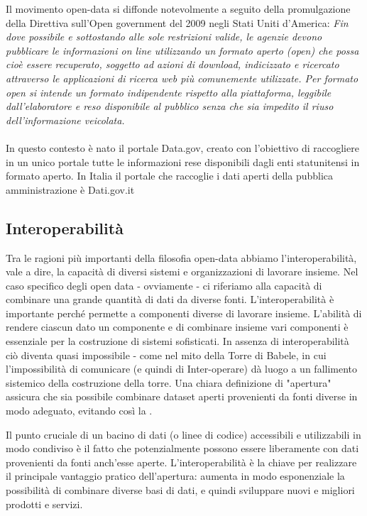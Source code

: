 \documentclass{article}
\theoremstyle{plain}
\theoremstyle{definition}
\begin{document}
Il movimento open-data si diffonde notevolmente a seguito della promulgazione della Direttiva sull'Open government del 2009 negli Stati Uniti d'America:
\textit{Fin dove possibile e sottostando alle sole restrizioni valide, le agenzie devono pubblicare le informazioni on line utilizzando un formato aperto (open) che possa cioè essere recuperato, soggetto ad azioni di download, indicizzato e ricercato attraverso le applicazioni di ricerca web più comunemente utilizzate. Per formato open si intende un formato indipendente rispetto alla piattaforma, leggibile dall'elaboratore e reso disponibile al pubblico senza che sia impedito il riuso dell'informazione veicolata.}
\\
\\
In questo contesto è nato il portale Data.gov, creato con l'obiettivo di raccogliere in un unico portale tutte le informazioni rese disponibili dagli enti statunitensi in formato aperto. In Italia il portale che raccoglie i dati aperti della pubblica amministrazione è Dati.gov.it
 
\subsection{Interoperabilità}
Tra le ragioni più importanti della filosofia open-data abbiamo l'interoperabilità, vale a dire, la capacità di diversi sistemi e organizzazioni di lavorare insieme. Nel caso specifico degli open data - ovviamente - ci riferiamo alla capacità di combinare una grande quantità di dati da diverse fonti. L'interoperabilità è importante perché permette a componenti diverse di lavorare insieme. L'abilità di rendere ciascun dato un componente e di combinare insieme vari componenti è essenziale per la costruzione di sistemi sofisticati. In assenza di interoperabilità ciò diventa quasi impossibile - come nel mito della Torre di Babele, in cui l'impossibilità di comunicare (e quindi di Inter-operare) dà luogo a un fallimento sistemico della costruzione della torre. Una chiara definizione di "apertura" assicura che sia possibile combinare dataset aperti provenienti da fonti diverse in modo adeguato, evitando così la .

Il punto cruciale di un bacino di dati (o linee di codice) accessibili e utilizzabili in modo condiviso è il fatto che potenzialmente possono essere liberamente  con dati provenienti da fonti anch'esse aperte. L'interoperabilità è la chiave per realizzare il principale vantaggio pratico dell'apertura: aumenta in modo esponenziale la possibilità di combinare diverse basi di dati, e quindi sviluppare nuovi e migliori prodotti e servizi.
\footnotemark
{}
\end{document}
